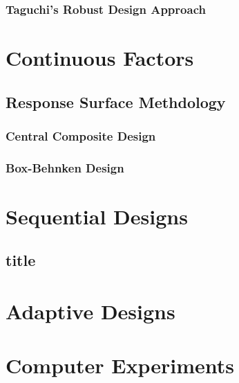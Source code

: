 \subsubsection{Taguchi's Robust Design Approach}



\section{Continuous Factors}



\subsection{Response Surface Methdology}

\subsubsection{Central Composite Design}

\subsubsection{Box-Behnken Design}




\section{Sequential Designs}

\subsection{title}



\section{Adaptive Designs}



\section{Computer Experiments}

